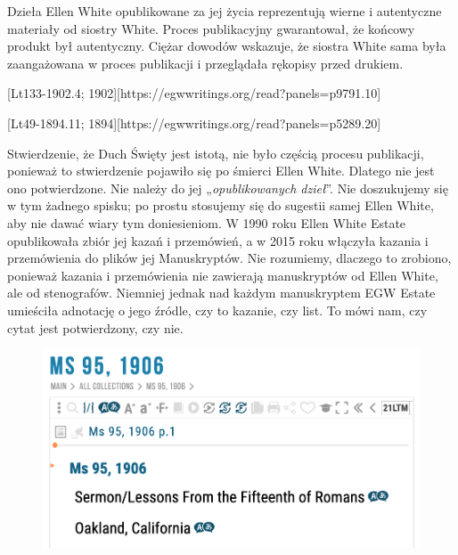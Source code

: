 Dzieła Ellen White opublikowane za jej życia reprezentują wierne i autentyczne materiały od siostry White. Proces publikacyjny gwarantował, że końcowy produkt był autentyczny. Ciężar dowodów wskazuje, że siostra White sama była zaangażowana w proces publikacji i przeglądała rękopisy przed drukiem.

[Lt133-1902.4; 1902][https://egwwritings.org/read?panels=p9791.10]

[Lt49-1894.11; 1894][https://egwwritings.org/read?panels=p5289.20]

Stwierdzenie, że Duch Święty jest istotą, nie było częścią procesu publikacji, ponieważ to stwierdzenie pojawiło się po śmierci Ellen White. Dlatego nie jest ono potwierdzone. Nie należy do jej „\textit{opublikowanych dzieł}”. Nie doszukujemy się w tym żadnego spisku; po prostu stosujemy się do sugestii samej Ellen White, aby nie dawać wiary tym doniesieniom. W 1990 roku Ellen White Estate opublikowała zbiór jej kazań i przemówień, a w 2015 roku włączyła kazania i przemówienia do plików jej Manuskryptów. Nie rozumiemy, dlaczego to zrobiono, ponieważ kazania i przemówienia nie zawierają manuskryptów od Ellen White, ale od stenografów. Niemniej jednak nad każdym manuskryptem EGW Estate umieściła adnotację o jego źródle, czy to kazanie, czy list. To mówi nam, czy cytat jest potwierdzony, czy nie.

\begin{figure}
    \centering
    \includegraphics[width=1\linewidth]{images/sermons-and-talks.png}
    \label{fig:enter-label}
\end{figure}

